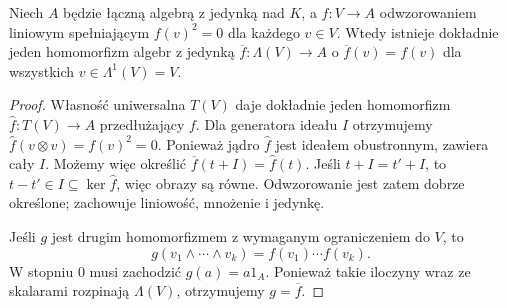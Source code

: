 \begin{twierdzenie}
\label{thm:lin11-zew-uniwersalna}
Niech \(A\) będzie łączną algebrą
z jedynką nad \(K\), a
\(f\colon V\to A\) odwzorowaniem
liniowym spełniającym
\(f(v)^2=0\) dla każdego \(v\in V\).
Wtedy istnieje dokładnie jeden
homomorfizm algebr z jedynką
\(\overline f\colon\Lambda(V)\to A\)
o \(\overline f(v)=f(v)\)
dla wszystkich \(v\in\Lambda^1(V)=V\).
\end{twierdzenie}
\begin{proof}
Własność uniwersalna \(T(V)\)
daje dokładnie jeden homomorfizm
\(\widehat f\colon T(V)\to A\)
przedłużający \(f\).
Dla generatora ideału \(I\)
otrzymujemy
\(\widehat f(v\otimes v)=f(v)^2=0\).
Ponieważ jądro \(\widehat f\)
jest ideałem obustronnym,
zawiera cały \(I\).
Możemy więc określić
\(\overline f(t+I)=\widehat f(t)\).
Jeśli \(t+I=t'+I\), to
\(t-t'\in I\subseteq\ker\widehat f\),
więc obrazy są równe.
Odwzorowanie jest zatem
dobrze określone; zachowuje
liniowość, mnożenie i jedynkę.

Jeśli \(g\) jest drugim
homomorfizmem z wymaganym
ograniczeniem do \(V\), to
\[
 g(v_1\wedge\cdots\wedge v_k)
 =f(v_1)\cdots f(v_k).
\]
W stopniu \(0\) musi zachodzić
\(g(a)=a1_A\). Ponieważ
takie iloczyny wraz ze skalarami
rozpinają \(\Lambda(V)\),
otrzymujemy \(g=\overline f\).
\end{proof}

